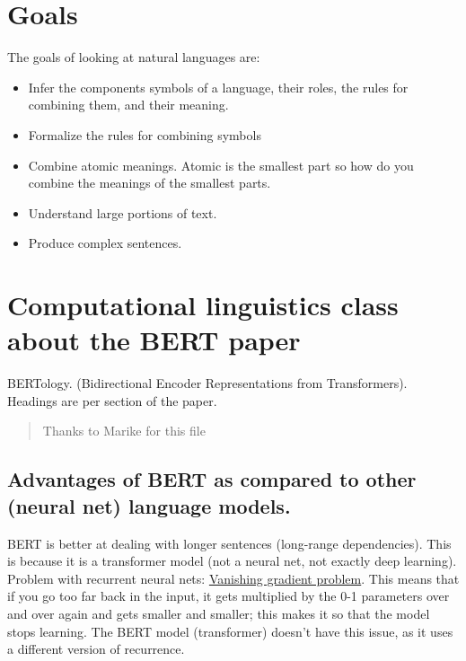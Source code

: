 \documentclass[
  11pt,
  british,
]{article}
\providecommand{\tightlist}{%
  \setlength{\itemsep}{0pt}\setlength{\parskip}{0pt}}
\begin{document}
\hypertarget{goals-1}{%
\section{Goals}\label{goals-1}}

The goals of looking at natural languages are:

\begin{itemize}
\tightlist
\item
  Infer the components symbols of a language, their roles, the rules for
  combining them, and their meaning.
\item
  Formalize the rules for combining symbols
\item
  Combine atomic meanings. Atomic is the smallest part so how do you
  combine the meanings of the smallest parts.
\item
  Understand large portions of text.
\item
  Produce complex sentences.
\end{itemize}

\hypertarget{computational-linguistics-class-about-the-bert-paper}{%
\section{Computational linguistics class about the BERT
paper}\label{computational-linguistics-class-about-the-bert-paper}}

BERTology. (Bidirectional Encoder Representations from Transformers).
Headings are per section of the paper.

\begin{quote}
Thanks to Marike for this file
\end{quote}

\hypertarget{advantages-of-bert-as-compared-to-other-neural-net-language-models.}{%
\subsection{Advantages of BERT as compared to other (neural net)
language
models.}\label{advantages-of-bert-as-compared-to-other-neural-net-language-models.}}

BERT is better at dealing with longer sentences (long-range
dependencies). This is because it is a transformer model (not a neural
net, not exactly deep learning). Problem with recurrent neural nets:
\href{../Prediction/Vanishing\%20gradient\%20problem.md}{Vanishing
gradient problem}. This means that if you go too far back in the input,
it gets multiplied by the 0-1 parameters over and over again and gets
smaller and smaller; this makes it so that the model stops learning. The
BERT model (transformer) doesn't have this issue, as it uses a different
version of recurrence.
\end{document}
